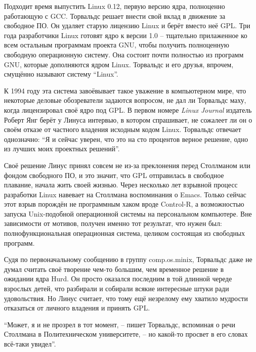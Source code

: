 Подходит время выпустить Linux 0.12, первую версию ядра, полноценно работающую с GCC. Торвальдс решает внести свой вклад в движение за свободное ПО. Он удаляет старую лицензию Linux и берёт вместо неё GPL. Три года разработчики Linux готовят ядро к версии 1.0 -- тщательно прилаженное ко всем остальным программам проекта GNU, чтобы получить полноценную свободную операционную систему. Она состоит почти полностью из программ GNU, которые дополняются ядром Linux. Торвальдс и его друзья, впрочем, смущённо называют систему \enquote{Linux}.

К 1994 году эта система завоёвывает такое уважение в компьютерном мире, что некоторые деловые обозреватели задаются вопросом, не дал ли Торвальдс маху, когда лицензировал своё ядро под GPL. В первом номере \textit{Linux Journal} издатель Роберт Янг берёт у Линуса интервью, в котором спрашивает, не сожалеет ли он о своём отказе от частного владения исходным кодом Linux. Торвальдс отвечает однозначно: \enquote{Я и сейчас уверен, что это на сто процентов верное решение, одно из лучших моих проектных решений}. 

Своё решение Линус принял совсем не из-за преклонения перед Столлманом или фондом свободного ПО, и это значит, что GPL отправилась в свободное плавание, начала жить своей жизнью. Через несколько лет взрывной процесс разработки Linux навевает на Столлмана воспоминания о Emacs. Только сейчас этот взрыв порождён не программным хаком вроде Control-R, а возможностью запуска Unix-подобной операционной системы на персональном компьютере. Вне зависимости от мотивов, получен именно тот результат, что нужен был: полнофункциональная операционная система, целиком состоящая из свободных программ.

Судя по первоначальному сообщению в группу comp.os.minix, Торвальдс даже не думал считать своё творение чем-то большим, чем временное решение в ожидании ядра Hurd. Он просто оказался последним в той длинной череде взрослых детей, что разбирали и собирали всякие интересные штуки ради удовольствия. Но Линус считает, что тому ещё незрелому ему хватило мудрости отказаться от личного владения и принять GPL.

\enquote{Может, я и не прозрел в тот момент, -- пишет Торвальдс, вспоминая о речи Столлмана в Политехническом университете, -- но какой-то просвет в его словах всё-таки увидел}.

\theendnotes
\setcounter{endnote}{0}
